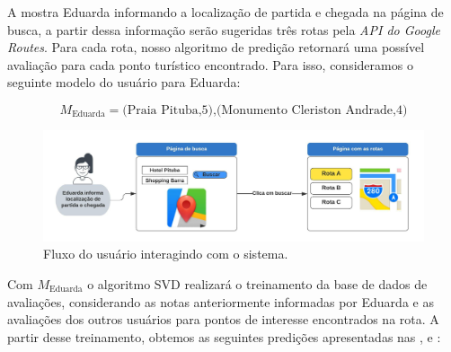 \documentclass[portuguese]{textolivre}
\begin{document}

A  mostra Eduarda informando a localização de partida e chegada na página de busca, a partir dessa informação serão sugeridas três rotas pela \textit{API do Google Routes}. Para cada rota, nosso algoritmo de predição retornará uma possível avaliação para cada ponto turístico encontrado. Para isso, consideramos o seguinte modelo do usuário para Eduarda:

\begin{equation}
\label{eq:usermodelexample}
M_{\text{Eduarda}} =  \text{(Praia Pituba,5),(Monumento Cleriston Andrade,4)} 
\end{equation}

\begin{figure}[htbp]
\centering
\begin{minipage}{.9\textwidth}
\includegraphics[width=\textwidth]{imagens/fig-005.jpeg}
\caption{Fluxo do usuário interagindo com o sistema.}
\label{fig-005}
\end{minipage}
\end{figure}

Com $M_{\text{Eduarda}}$ o algoritmo SVD realizará o treinamento da base de dados de avaliações, considerando as notas anteriormente informadas por Eduarda e as avaliações dos outros usuários para pontos de interesse encontrados na rota. A partir desse treinamento, obtemos as seguintes predições apresentadas nas ,  e :


\end{document}
